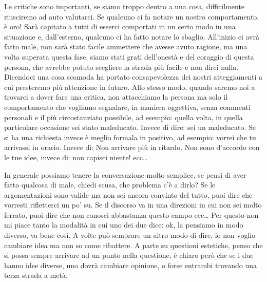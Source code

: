 \documentclass[12pt]{book} %
\begin{document}
Le critiche sono importanti, se siamo troppo dentro a una cosa, difficilmente riusciremo ad auto valutarci. 
Se qualcuno ci fa notare un nostro comportamento, è oro! Sarà capitato a tutti di esserci comportati
in un certo modo in una situazione e, dall'esterno, qualcuno ci ha fatto notare lo sbaglio.
All'inizio ci avrà fatto male, non sarà stato facile ammettere che avesse avuto ragione, ma una
volta superata questa fase, siamo stati grati dell'onestà e del coraggio di questa persona, che avrebbe potuto scegliere la strada più facile e non dirci nulla.
Dicendoci una cosa scomoda ha portato consapevolezza dei nostri atteggiamenti a cui presteremo più attenzione in
futuro. Allo stesso modo, quando saremo noi a trovarci a dover fare una critica, non attacchiamo la persona ma solo il
comportamento che vogliamo segnalare, in maniera oggettiva, senza commenti personali e il più circostanziato possibile,
ad esempio: quella volta, in quella particolare occasione sei stato maleducato. Invece di dire: sei un maleducato. Se
si ha una richiesta invece è meglio formala in positivo, ad esempio: vorrei che tu arrivassi in orario. Invece di: Non
arrivare più in ritardo. Non sono d'accordo con le tue idee, invece di: non capisci niente! ecc…

In generale possiamo tenere la conversazione molto semplice, se pensi di aver fatto qualcosa di male, chiedi scusa, che problema c'è a dirlo? Se le argomentazioni sono valide ma non sei ancora convinto del tutto, puoi dire che vorresti rifletterci un po' su. Se il discorso va in una direzioni in cui non sei molto ferrato, puoi dire che non conosci abbastanza questo campo ecc…
Per questo non mi piace tanto la modalità in cui uno dei due dice: ok, la pensiamo in modo diverso, va bene così. A volte può sembrare un altro modo di dire, io non voglio cambiare idea ma non so come ribattere. A parte su questioni estetiche, penso che si possa sempre arrivare ad un punto nella questione, è chiaro però che se i due hanno idee diverse, uno dovrà cambiare opinione, o forse entrambi trovando una terza strada a metà.
\end{document}
